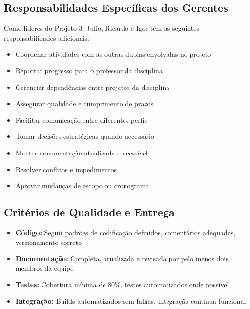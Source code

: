 \subsection{Responsabilidades Específicas dos Gerentes}

Como líderes do Projeto 3, Julio, Ricardo e Igor têm as seguintes responsabilidades adicionais:

\begin{itemize}
    \item Coordenar atividades com as outras duplas envolvidas no projeto
    \item Reportar progresso para o professor da disciplina
    \item Gerenciar dependências entre projetos da disciplina
    \item Assegurar qualidade e cumprimento de prazos
    \item Facilitar comunicação entre diferentes perfis
    \item Tomar decisões estratégicas quando necessário
    \item Manter documentação atualizada e acessível
    \item Resolver conflitos e impedimentos
    \item Aprovar mudanças de escopo ou cronograma
\end{itemize}

\subsection{Critérios de Qualidade e Entrega}

\begin{itemize}
    \item \textbf{Código:} Seguir padrões de codificação definidos, comentários adequados, versionamento correto
    \item \textbf{Documentação:} Completa, atualizada e revisada por pelo menos dois membros da equipe
    \item \textbf{Testes:} Cobertura mínima de 80\%, testes automatizados onde possível
    \item \textbf{Integração:} Builds automatizados sem falhas, integração contínua funcional
\end{itemize}
